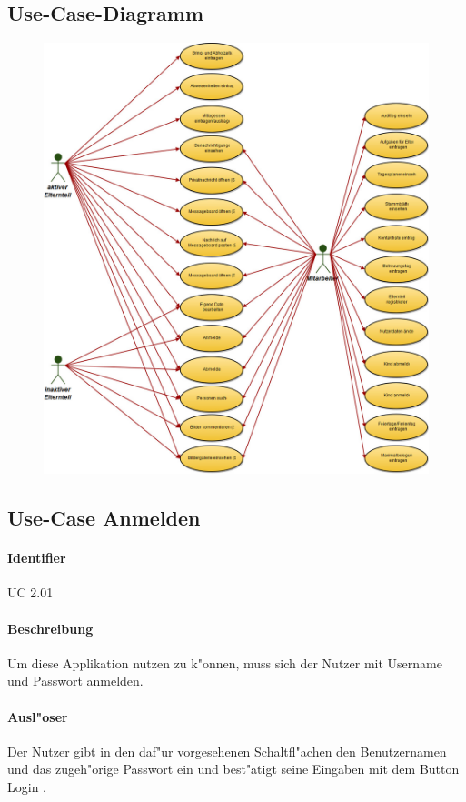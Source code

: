  \subsection{Use-Case-Diagramm}
 \begin{figure}[ht!]
  \includegraphics[width = 150mm]{pictures/usecasediagram.jpg}
 \end{figure}

 
 \newpage
 \subsection{Use-Case  Anmelden}
  \paragraph{Identifier}
    UC 2.01
  \paragraph{Beschreibung}
    Um diese Applikation nutzen zu k"onnen, muss sich der Nutzer mit Username und Passwort anmelden.
  \paragraph{Ausl"oser}
    Der Nutzer gibt in den daf"ur vorgesehenen Schaltfl"achen den Benutzernamen und das zugeh"orige Passwort ein und best"atigt seine Eingaben mit dem Button \dq Login \dq.
